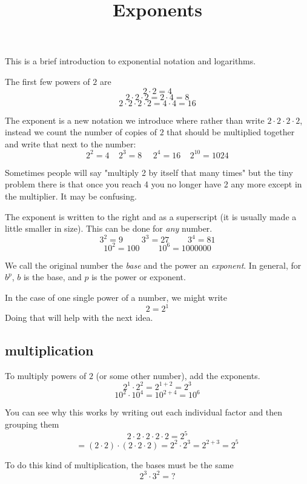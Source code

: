 \documentclass[11pt, oneside]{article}
\title{Exponents}
\date{}
\begin{document}
\maketitle
\Large


This is a brief introduction to exponential notation and logarithms.

The first few powers of $2$ are
\[ 2 \cdot 2 = 4 \]
\[ 2 \cdot 2 \cdot 2 = 2 \cdot 4 = 8 \]
\[ 2 \cdot 2 \cdot 2 \cdot 2 = 4 \cdot 4 = 16 \]

The exponent is a new notation we introduce where rather than write $2 \cdot 2 \cdot 2 \cdot 2$, instead we count the number of copies of $2$ that should be multiplied together and write that next to the number:
\[ 2^2 = 4 \ \ \ \ \  2^3 = 8 \ \ \ \ \ \ 2^4 = 16 \ \ \ \ \ 2^{10} = 1024 \]

Sometimes people will say "multiply 2 by itself that many times" but the tiny problem there is that once you reach 4 you no longer have 2 any more except in the multiplier.  It may be confusing.

The exponent is written to the right and as a superscript (it is usually made a little smaller in size).  This can be done for \emph{any} number.
\[ 3^2 = 9 \ \ \ \ \ \ \ \ \ \ 3^3 = 27 \ \ \ \ \ \ \ \ \ \ 3^4 = 81 \]
\[ 10^2 = 100 \ \ \ \ \ \ \ \ \ \ 10^6 = 1000000 \]

We call the original number the \emph{base} and the power an \emph{exponent}.  In general, for $b^p$,
$b$ is the base, and $p$ is the power or exponent.

In the case of one single power of a number, we might write
\[ 2 = 2^1 \]
Doing that will help with the next idea.

\subsection*{multiplication}

To multiply powers of $2$ (or some other number), add the exponents.
\[ 2^1 \cdot 2^2 = 2^{1+2} = 2^3 \]
\[ 10^2 \cdot 10^4 = 10^{2+4} = 10^6 \]

You can see why this works by writing out each individual factor and then grouping them
\[ 2 \cdot 2 \cdot 2 \cdot 2 \cdot 2 = 2^5 \]
\[ = (2 \cdot 2) \cdot (2 \cdot 2 \cdot 2) = 2^2 \cdot 2^3 = 2^{2 + 3} = 2^5 \]

To do this kind of multiplication, the bases must be the same
\[ 2^3 \cdot 3^2 = \text{?} \]
\end{document}
